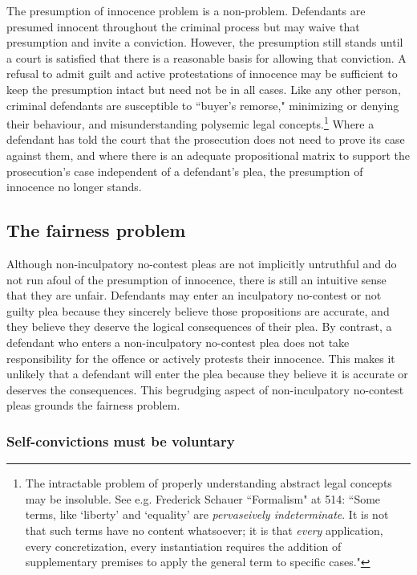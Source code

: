 The presumption of innocence problem is a non-problem. Defendants are presumed innocent throughout the criminal process but may waive that presumption and invite a conviction. However, the presumption still stands until a court is satisfied that there is a reasonable basis for allowing that conviction. A refusal to admit guilt and active protestations of innocence may be sufficient to keep the presumption intact but need not be in all cases. Like any other person, criminal defendants are susceptible to ``buyer's remorse," minimizing or denying their behaviour, and  misunderstanding polysemic legal concepts.\footnote{The intractable problem of properly understanding abstract legal concepts may be insoluble. See e.g. Frederick Schauer ``Formalism" at 514: ``Some terms, like `liberty' and `equality' are \textit{pervaseively indeterminate}. It is not that such terms have no content whatsoever; it is that \textit{every} application, every concretization, every instantiation requires the addition of supplementary premises to apply the general term to specific cases."} Where a defendant has told the court that the prosecution does not need to prove its case against them, and where there is an adequate propositional matrix to support the prosecution's case independent of a defendant's plea, the presumption of innocence no longer stands.

\subsection{The fairness problem}

Although non-inculpatory no-contest pleas are not implicitly untruthful and do not run afoul of the presumption of innocence, there is still an intuitive sense that they are unfair. Defendants may enter an inculpatory no-contest or not guilty plea because they sincerely believe those propositions are accurate, and they believe they deserve the logical consequences of their plea. By contrast, a defendant who enters a non-inculpatory no-contest plea does not take responsibility for the offence or actively protests their innocence. This makes it unlikely that a defendant will enter the plea because they believe it is accurate or deserves the consequences. This begrudging aspect of non-inculpatory no-contest pleas grounds the fairness problem. 

\subsubsection{Self-convictions must be voluntary}



